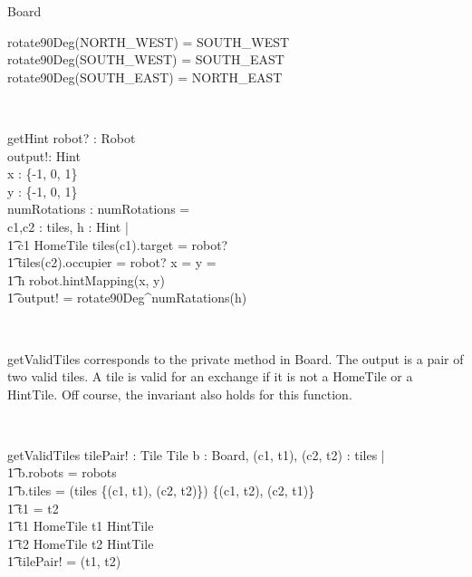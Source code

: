 \documentclass[12pt]{article}
\begin{document}
\begin{class}{Board}
\begin{axdef}
rotate90Deg(NORTH\_WEST) = SOUTH\_WEST \\
rotate90Deg(SOUTH\_WEST) = SOUTH\_EAST \\
rotate90Deg(SOUTH\_EAST) = NORTH\_EAST
\end{axdef} \\
\begin{schema}{getHint}
robot? : Robot \\
output!: Hint \\
\delta x : \{-1, 0, 1\} \\
\delta y : \{-1, 0, 1\} \\
numRotations : \nat
\where
numRotations =  \\
\also \also \also \also \also
\exists c1,c2 : \ran tiles, h : Hint | \\ \t1 c1 \in HomeTile \wedge
 tiles(c1).target = robot? \; \; \wedge \\ \t1 tiles(c2).occupier = robot? \wedge
 \delta x =  \wedge \delta y =  \; \; \wedge \\ \t1
 h \in robot.hintMapping(\delta x, \delta y) \; \; \wedge \\ \t1
 output! = rotate90Deg^{numRatations}(h)
\end{schema} \\
\znewpage
\begin{classcom}
getValidTiles corresponds to the private method in Board. The output is a pair of two valid tiles. A tile is valid for an exchange if it is not a HomeTile or a HintTile. Off course, the invariant also holds for this function.
\end{classcom} \\
\begin{schema}{getValidTiles}
tilePair! : Tile \cross Tile
\where
\exists b : Board, (c1, t1), (c2, t2) : tiles | \\ \t1
b.robots = robots \;\; \wedge \\ \t1
 b.tiles = (tiles \setminus \{(c1, t1), (c2, t2)\}) \cup \{(c1, t2), (c2, t1)\} \\ \t1
t1 \not = t2 \; \;  \wedge \\ \t1
t1 \not \in HomeTile \wedge t1 \not \in HintTile \; \; \wedge \\ \t1
t2 \not \in HomeTile \wedge t2 \not \in HintTile \; \; \wedge \\ \t1
tilePair! = (t1, t2)
\end{schema} \\
\begin{classcom}

\end{classcom}
\end{class}
\end{document}
